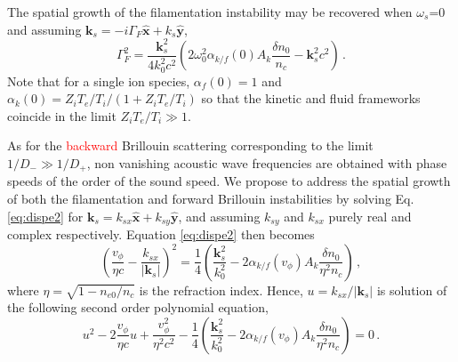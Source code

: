 \documentclass[
 reprint,
 superscriptaddress,
 amsmath,amssymb,
 aps,
]{revtex4-1}
\def\tc{\textcolor{red}}
\begin{document}
The spatial growth of the filamentation instability may be recovered when $\omega_s$=0 and assuming $\mathbf{k}_s = -i\Gamma_F\hat{\mathbf{x}} + k_s \hat{\mathbf{y}}$,
\begin{equation}\label{eq:gf} 
\Gamma_F^2
=\frac{\mathbf{k}_s^2}{4k_0^2c^2}\left( 2\omega_{0}^2\alpha_{k/f}(0)A_k\frac{\delta n_0}{n_c}- \mathbf{k}_s^2c^2 \right) 
\, .
\end{equation}
Note that for a single ion species,  $\alpha_f(0)=1$ and $\alpha_k(0)= Z_iT_e/T_i/(1+Z_iT_e/T_i)$ so that the kinetic and fluid frameworks coincide in the limit $Z_iT_e/T_i\gg 1$.

As for the \tc{backward} Brillouin scattering  corresponding to the limit $1/D_-\gg1/D_+$, non vanishing acoustic wave frequencies are obtained with  phase speeds of the order of the sound speed. We propose to address the spatial growth of both the filamentation and forward Brillouin instabilities  by solving Eq. \eqref{eq:dispe2} for  $\mathbf{k}_s = k_{sx} \hat{\mathbf{x}} +k_{sy} \hat{\mathbf{y}}$, and assuming 
$ k_{sy}$ and $k_{sx}$ purely real and complex  respectively. Equation \eqref{eq:dispe2} then becomes 
\begin{equation}\label{eq:dispe3} 
\left(\frac{v_\phi}{\eta c} - 
\frac{ k_{sx}}{\vert \mathbf{k}_s\vert }\right)^2
=\frac{1}{4} \left( \frac{\mathbf{k}_s^2}{k_0^2} - 2\alpha_{k/f}(v_\phi)A_k\frac{\delta n_0}{\eta^2n_c} \right) 
\, ,
\end{equation}
where $\eta=\sqrt{1-n_{e0}/n_c}$ is the refraction index.
Hence, $u =  k_{sx}/\vert \mathbf{k}_s\vert $ is solution of the following second order polynomial equation, 
\begin{equation}\label{eq:dispe2poly} 
u^2 -2\frac{v_\phi}{\eta c}u +\frac{v_\phi^2}{\eta^2 c^2}-\frac{1}{4}\left( \frac{\mathbf{k}_s^2}{k_0^2} - 2\alpha_{k/f}(v_\phi)A_k\frac{\delta n_0}{\eta^2n_c} \right) =0 
\, .
\end{equation}
\end{document}
